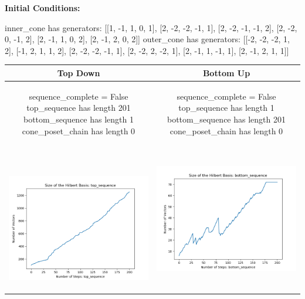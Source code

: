 \documentclass[10pt]{article}
\begin{document}
\textbf{Initial Conditions:}
\begin{SAGE}
inner_cone has generators: 
[[1, -1, 1, 0, 1], [2, -2, -2, -1, 1], [2, -2, -1, -1, 2], [2, -2, 0, -1, 2], [2, -1, 1, 0, 2], [2, -1, 2, 0, 2]]
outer_cone has generators: 
[[-2, -2, -2, 1, 2], [-1, 2, 1, 1, 2], [2, -2, -2, -1, 1], [2, -2, 2, -2, 1], [2, -1, 1, -1, 1], [2, -1, 2, 1, 1]]

\end{SAGE}
\begin{tabular}{c|c}
\textbf{Top Down} & \textbf{Bottom Up} \\ \hline  
\begin{SAGE}
	sequence_complete = False
	top_sequence has length 201
	bottom_sequence has length 1
	cone_poset_chain has length 0
\end{SAGE} 
&
\begin{SAGE}
	sequence_complete = False
	top_sequence has length 1
	bottom_sequence has length 201
	cone_poset_chain has length 0
\end{SAGE} 
\\ \hline
\
\begin{minipage}{.45\textwidth}
\includegraphics[width=\textwidth]{"DATA/5d/6 generators 2 bound A/top_sequence SIZE"}
\end{minipage} &
\begin{minipage}{.45\textwidth}
\includegraphics[width=\textwidth]{"DATA/5d/6 generators 2 bound A bottomup/bottom_sequence SIZE"}

\end{minipage}
\end{tabular}
\end{document}
